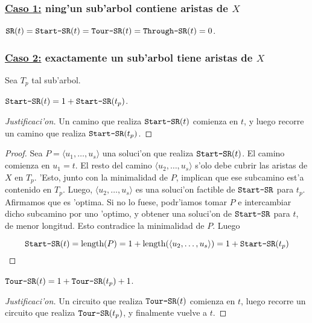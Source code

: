 \subsubsection*{\underline{Caso 1:} ning'un sub'arbol contiene aristas de $X$}

\begin{claim}
\label{cl:recurrencia_sr_1}
$\texttt{SR}(t) = \texttt{Start-SR}(t) = \texttt{Tour-SR}(t) = \texttt{Through-SR}(t) = 0$.
\end{claim}

\subsubsection*{\underline{Caso 2:} exactamente un sub'arbol tiene aristas de $X$}

Sea $T_p$ tal sub'arbol.

\begin{claim}
$\texttt{Start-SR}(t) = 1 + \texttt{Start-SR}(t_p)$.

\begin{proof}[Justificaci'on]
Un camino que realiza $\texttt{Start-SR}(t)$ comienza en $t$, y luego recorre un camino que realiza $\texttt{Start-SR}(t_p)$.
\end{proof}

\begin{proof}
Sea $P = \langle u_1, \dots, u_s \rangle$ una soluci'on que realiza $\texttt{Start-SR}(t)$. El camino comienza en $u_1 = t$. El resto del camino $\langle u_2, \dots, u_s \rangle$ s'olo debe cubrir las aristas de $X$ en $T_p$. 'Esto, junto con la minimalidad de $P$, implican que ese subcamino est'a contenido en $T_p$. Luego, $\langle u_2, \dots, u_s \rangle$ es una soluci'on factible de $\texttt{Start-SR}$ para $t_p$. Afirmamos que es 'optima. Si no lo fuese, podr'iamos tomar $P$ e intercambiar dicho subcamino por uno 'optimo, y obtener una soluci'on de $\texttt{Start-SR}$ para $t$, de menor longitud. Esto contradice la minimalidad de $P$. Luego

\[\texttt{Start-SR}(t) = \textnormal{length}(P) = 1 + \textnormal{length}(\langle u_2, \dots, u_s \rangle) = 1 + \texttt{Start-SR}(t_p)\]
\end{proof}
\end{claim}

\begin{claim}
$\texttt{Tour-SR}(t) = 1 + \texttt{Tour-SR}(t_p) + 1$.

\begin{proof}[Justificaci'on]
Un circuito que realiza $\texttt{Tour-SR}(t)$ comienza en $t$, luego recorre un circuito que realiza $\texttt{Tour-SR}(t_p)$, y finalmente vuelve a $t$.
\end{proof}
\end{claim}

